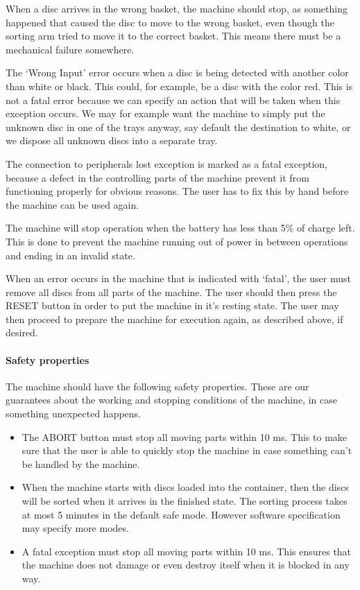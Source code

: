 \documentclass[a4paper,oneside,11pt]{article}
\begin{document}
When a disc arrives in the wrong basket, the machine should stop, as something happened that caused the disc to move to the wrong basket, even though the sorting arm tried to move it to the correct basket. This means there must be a mechanical failure somewhere.

The ‘Wrong Input’ error occurs when a disc is being detected with another color than white or black. This could, for example, be a disc with the color red. This is not a fatal error because we can specify an action that will be taken when this exception occurs. We may for example want the machine to simply put the unknown disc in one of the trays anyway, say default the destination to white, or we dispose all unknown discs into a separate tray.

The connection to peripherals lost exception is marked as a fatal exception, because a defect in the controlling parts of the machine prevent it from functioning properly for obvious reasons. The user has to fix this by hand before the machine can be used again.

The machine will stop operation when the battery has less than 5\% of charge left. This is done to prevent the machine running out of power in between operations and ending in an invalid state. 

When an error occurs in the machine that is indicated with ‘fatal’, the user must remove all discs from all parts of the machine. The user should then press the RESET button in order to put the machine in it’s resting state. The user may then proceed to prepare the machine for execution again, as described above, if desired.

\paragraph{Safety properties}
The machine should have the following safety properties. These are our guarantees about the working and stopping conditions of the machine, in case something unexpected happens.

\begin{itemize}
	\item The ABORT button must stop all moving parts within 10 ms. This to make sure that the user is able to quickly stop the machine in case something can’t be handled by the machine.
	\newpage
	\item When the machine starts with discs loaded into the container, then the discs will be sorted when it arrives in the finished state. The sorting process takes at most 5 minutes in the default safe mode. However software specification may specify more modes.
	\item A fatal exception must stop all moving parts within 10 ms. This ensures that the machine does not damage or even destroy itself when it is blocked in any way.
\end{itemize}
\end{document}
